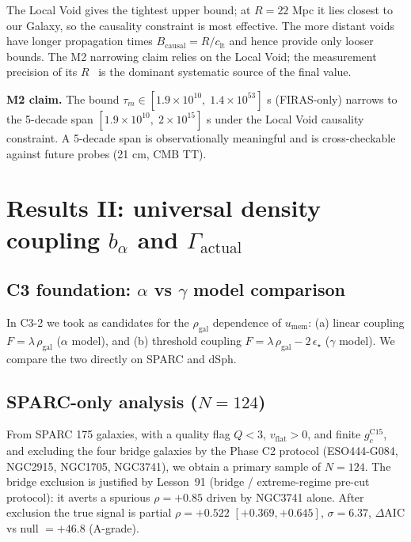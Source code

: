 \documentclass[11pt,a4paper]{article}
\newcommand{\taum}{\tau_{m}}
\newcommand{\bal}{b_{\alpha}}
\newcommand{\umem}{u_{\mathrm{mem}}}
\newcommand{\rhogal}{\rho_{\mathrm{gal}}}
\newcommand{\Gammaact}{\Gamma_{\mathrm{actual}}}
\newcommand{\gc}{g_{c}}
\newcommand{\vflat}{v_{\mathrm{flat}}}
\newcommand{\clt}{c_{\mathrm{lt}}}
\newcommand{\AIC}{\Delta\mathrm{AIC}}
\begin{document}
The Local Void gives the tightest upper bound; at $R = 22$ Mpc it lies closest to our Galaxy, so
the causality constraint is most effective. The more distant voids have longer propagation times
$B_{\mathrm{causal}} = R/\clt$ and hence provide only looser bounds. The M2 narrowing claim relies
on the Local Void; the measurement precision of its $R$~\citep{Kreckel2011} is the dominant
systematic source of the final value.

\begin{keybox}
\textbf{M2 claim.}
The bound $\taum \in [1.9 \times 10^{10},\; 1.4 \times 10^{53}]$ s (FIRAS-only) narrows to the
5-decade span $[1.9 \times 10^{10},\; 2 \times 10^{15}]$ s under the Local Void causality
constraint. A 5-decade span is observationally meaningful and is cross-checkable against future
probes (21 cm, CMB TT).
\end{keybox}

\section{Results II: universal density coupling $\bal$ and $\Gammaact$}

\subsection{C3 foundation: $\alpha$ vs $\gamma$ model comparison}
In C3-2 we took as candidates for the $\rhogal$ dependence of $\umem$:
(a) linear coupling $F = \lambda\,\rhogal$ ($\alpha$ model), and
(b) threshold coupling $F = \lambda\,\rhogal - 2\,\epsilon_\star$ ($\gamma$ model).
We compare the two directly on SPARC and dSph.

\subsection{SPARC-only analysis ($N = 124$)}
From SPARC 175 galaxies, with a quality flag $Q < 3$, $\vflat > 0$, and finite $\gc^{\mathrm{C15}}$,
and excluding the four bridge galaxies by the Phase C2 protocol (ESO444-G084, NGC2915, NGC1705,
NGC3741), we obtain a primary sample of $N = 124$. The bridge exclusion is justified by
Lesson~91 (bridge / extreme-regime pre-cut protocol): it averts a spurious $\rho = +0.85$ driven
by NGC3741 alone. After exclusion the true signal is partial $\rho = +0.522$ $[+0.369, +0.645]$,
$\sigma = 6.37$, $\AIC$ vs null $= +46.8$ (A-grade).
\end{document}
